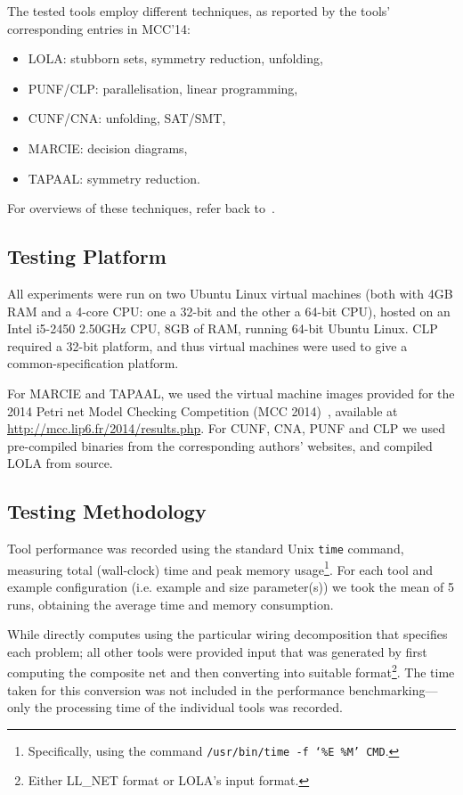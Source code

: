 The tested tools employ different techniques, as reported by the tools'
corresponding entries in MCC'14:
\begin{itemize}
\item LOLA: stubborn sets, symmetry reduction, unfolding,
\item PUNF/CLP: parallelisation, linear programming,
\item CUNF/CNA: unfolding, SAT/SMT,
\item MARCIE: decision diagrams,
\item TAPAAL: symmetry reduction.
\end{itemize}

For overviews of these techniques, refer back to~.

\subsection{Testing Platform}

All experiments were run on two Ubuntu Linux virtual machines (both with 4GB
RAM and a 4-core CPU: one a 32-bit and the other a 64-bit CPU), hosted on an
Intel i5-2450 2.50GHz CPU, 8GB of RAM, running 64-bit Ubuntu Linux. CLP
required a 32-bit platform, and thus virtual machines were used to give a
common-specification platform.

For MARCIE and TAPAAL, we used the virtual machine images provided for the 2014
Petri net Model Checking Competition (MCC 2014)~\cite{MCC2014}, available at
\url{http://mcc.lip6.fr/2014/results.php}. For CUNF, CNA, PUNF and CLP we used
pre-compiled binaries from the corresponding authors' websites, and compiled
LOLA from source.

\subsection{Testing Methodology}

Tool performance was recorded using the standard Unix \texttt{time} command,
measuring total (wall-clock) time and peak memory usage\footnote{Specifically,
using the command \texttt{/usr/bin/time -f `\%E \%M' CMD}.}. For each tool and
example configuration (i.e. example and size parameter(s)) we took the mean of
5 runs, obtaining the average time and memory consumption.

While \penrose{} directly computes using the particular wiring decomposition
that specifies each problem; all other tools were provided input that was
generated by first computing the composite net and then converting into
suitable format\footnote{Either LL\_NET format or LOLA's input format.}. The
time taken for this conversion was not included in the performance
benchmarking---only the processing time of the individual tools was recorded.

